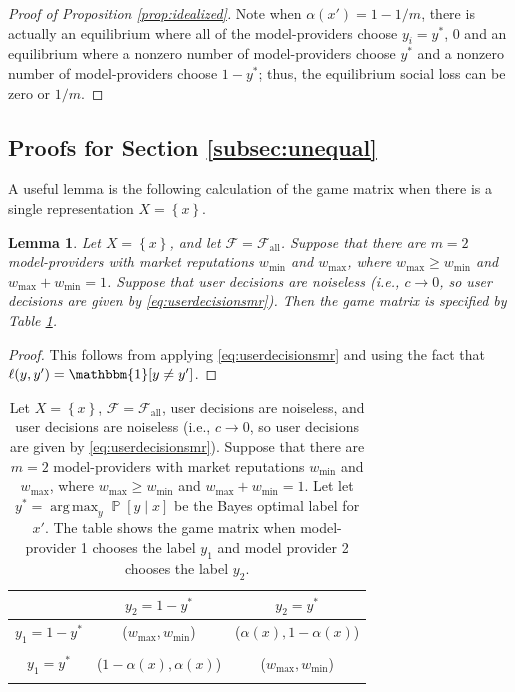 \documentclass[letterpaper,11pt]{article}
\newtheorem{lemma}{Lemma}
\theoremstyle{plain}
\DeclareMathOperator*{\argmax}{arg\,max}
\DeclareMathOperator*{\Prob}{\mathbb{P}}
\begin{document}
\begin{proof}[Proof of Proposition \ref{prop:idealized}]
Note when $\alpha(x') = 1 - 1/m$, there is actually an equilibrium where all of the model-providers choose $y_i = y^*$, $0$ and an equilibrium where a nonzero number of model-providers choose $y^*$ and a nonzero number of model-providers choose $1-y^*$; thus, the equilibrium social loss can be zero or $1/m$. 


\end{proof}

\subsection{Proofs for Section \ref{subsec:unequal}}



A useful lemma is the following calculation of the game matrix when there is a single representation $X = \left\{x\right\}$. 
\begin{lemma}
\label{lemma:gamematrix}
Let $X = \left\{x \right\}$, and let $\mathcal{F} = \mathcal{F}_{\text{all}}$. Suppose that there are $m=2$ model-providers with market reputations $w_{\text{min}}$ and $w_{\text{max}}$, where $w_{\text{max}} \ge w_{\text{min}}$ and $w_{\text{max}} +  w_{\text{min}} = 1$. Suppose that user decisions are noiseless (i.e., $c \rightarrow 0$, so user decisions are given by \eqref{eq:userdecisionsmr}). Then the game matrix is specified by Table \ref{tab:gamematrix}.  
\end{lemma}
\begin{proof}
This follows from applying \eqref{eq:userdecisionsmr} and using the fact that $\ell(y, y') = \mathbbm{1}[y \neq y']$. 
\end{proof}



\begin{table}[]
    \centering
    \begin{tabular}{c|c | c}
     & $y_2 = 1 - y^*$ & $y_2 = y^*$ \\
     \hline
     $y_1 = 1 - y^*$    &  ($w_{\text{max}}, w_{\text{min}}$)   &  ($\alpha(x), 1 - \alpha(x)$) \\ \\
     $y_1 = y^*$    &  ($1 - \alpha(x), \alpha(x)$)   & ($w_{\text{max}}, w_{\text{min}}$)\\
     \\
    \end{tabular}
    \caption{Let $X = \left\{x \right\}$, $\mathcal{F} = \mathcal{F}_{\text{all}}$, user decisions are noiseless, and user decisions are noiseless (i.e., $c \rightarrow 0$, so user decisions are given by \eqref{eq:userdecisionsmr}). Suppose that there are $m=2$ model-providers with market reputations $w_{\text{min}}$ and $w_{\text{max}}$, where $w_{\text{max}} \ge w_{\text{min}}$ and $w_{\text{max}} +  w_{\text{min}} = 1$. Let let $y^* =  \argmax_{y} \Prob[y \mid x]$ be the Bayes optimal label for $x'$. The table shows the game matrix when model-provider 1 chooses the label $y_1$ and model provider 2 chooses the label $y_2$.  }
    \label{tab:gamematrix}
\end{table}
\end{document}

